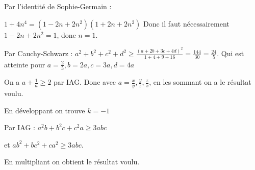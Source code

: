 \begin{sol}
Par l'identité de Sophie-Germain :

$1+4n^4=(1-2n+2n^2)(1+2n+2n^2)$
Donc il faut nécessairement $1-2n+2n^2=1$, donc $n=1$.
\end{sol}


\begin{sol}
Par Cauchy-Schwarz : $a^2+b^2+c^2+d^2\geq \frac{(a+2b+3c+4d)^2}{1+4+9+16}=\frac{144}{30}=\frac{24}{5}$.
Qui est atteinte pour $a=\frac{2}{5} , b=2a, c=3a, d=4a$
\end{sol}


\begin{sol}
On a $a+\frac{1}{a}\geq2$ par IAG. Donc avec $a=\frac{x}{y},\frac{y}{z},\frac{z}{x}$, en les sommant on a le résultat voulu.
\end{sol}


\begin{sol}
En développant on trouve $k=-1$
\end{sol}


\begin{sol}
Par IAG : $a^2b+b^2c+c^2a\geq 3abc$

et $ab^2+bc^2+ca^2\geq 3abc$.

En multipliant on obtient le résultat voulu.
\end{sol}
